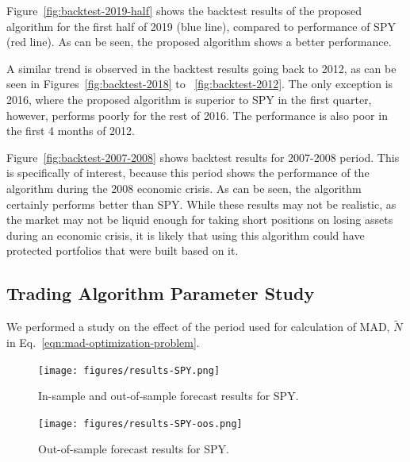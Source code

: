 \documentclass{article}
\begin{document}
Figure~\ref{fig:backtest-2019-half} shows the backtest results of the
proposed algorithm for the first half of 2019 (blue line), compared to
performance of SPY (red line). As can be seen, the proposed algorithm
shows a better performance.

A similar trend is observed in the backtest results going back to
2012, as can be seen in Figures~\ref{fig:backtest-2018} to
~\ref{fig:backtest-2012}. The only exception is 2016, where the
proposed algorithm is superior to SPY in the first quarter, however,
performs poorly for the rest of 2016. The performance is also poor in
the first 4 months of 2012.

Figure~\ref{fig:backtest-2007-2008} shows backtest results for
2007-2008 period. This is specifically of interest, because this
period shows the performance of the algorithm during the 2008 economic
crisis. As can be seen, the algorithm certainly performs better than
SPY. While these results may not be realistic, as the market may not
be liquid enough for taking short positions on losing assets during an
economic crisis, it is likely that using this algorithm could have
protected portfolios that were built based on it.

\subsection{Trading Algorithm Parameter Study}\label{subsection:mad-parameter-study}

We performed a study on the effect of the period used for calculation
of MAD, $\tilde{N}$ in Eq.~\ref{eqn:mad-optimization-problem}.

\newpage

\begin{figure}
\texttt{[image: figures/results-SPY.png]}
\caption{In-sample and out-of-sample forecast results for SPY.}
\label{fig:results-spy}
\end{figure}

\begin{figure}
\texttt{[image: figures/results-SPY-oos.png]}
\caption{Out-of-sample forecast results for SPY.}
\label{fig:results-spy-oos}
\end{figure}
\end{document}
